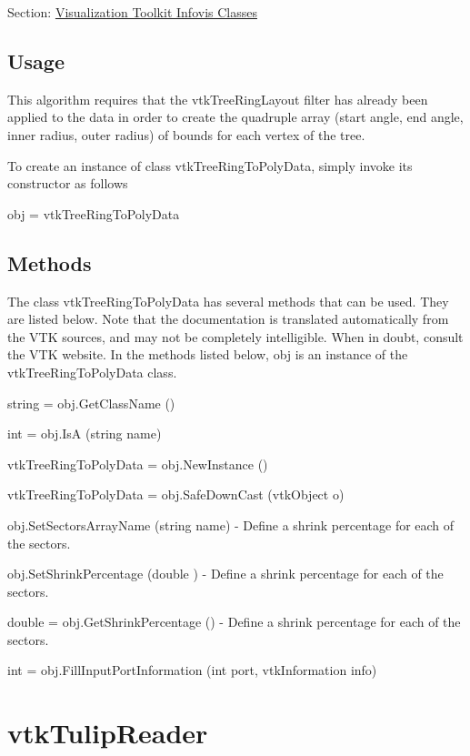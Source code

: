 Section\-: \hyperlink{sec_vtkinfovis}{Visualization Toolkit Infovis Classes} \hypertarget{vtkwidgets_vtkxyplotwidget_Usage}{}\subsection{Usage}\label{vtkwidgets_vtkxyplotwidget_Usage}
This algorithm requires that the vtk\-Tree\-Ring\-Layout filter has already been applied to the data in order to create the quadruple array (start angle, end angle, inner radius, outer radius) of bounds for each vertex of the tree.

To create an instance of class vtk\-Tree\-Ring\-To\-Poly\-Data, simply invoke its constructor as follows \begin{DoxyVerb}  obj = vtkTreeRingToPolyData
\end{DoxyVerb}
 \hypertarget{vtkwidgets_vtkxyplotwidget_Methods}{}\subsection{Methods}\label{vtkwidgets_vtkxyplotwidget_Methods}
The class vtk\-Tree\-Ring\-To\-Poly\-Data has several methods that can be used. They are listed below. Note that the documentation is translated automatically from the V\-T\-K sources, and may not be completely intelligible. When in doubt, consult the V\-T\-K website. In the methods listed below, {\ttfamily obj} is an instance of the vtk\-Tree\-Ring\-To\-Poly\-Data class. 
\begin{DoxyItemize}
\item {\ttfamily string = obj.\-Get\-Class\-Name ()}  
\item {\ttfamily int = obj.\-Is\-A (string name)}  
\item {\ttfamily vtk\-Tree\-Ring\-To\-Poly\-Data = obj.\-New\-Instance ()}  
\item {\ttfamily vtk\-Tree\-Ring\-To\-Poly\-Data = obj.\-Safe\-Down\-Cast (vtk\-Object o)}  
\item {\ttfamily obj.\-Set\-Sectors\-Array\-Name (string name)} -\/ Define a shrink percentage for each of the sectors.  
\item {\ttfamily obj.\-Set\-Shrink\-Percentage (double )} -\/ Define a shrink percentage for each of the sectors.  
\item {\ttfamily double = obj.\-Get\-Shrink\-Percentage ()} -\/ Define a shrink percentage for each of the sectors.  
\item {\ttfamily int = obj.\-Fill\-Input\-Port\-Information (int port, vtk\-Information info)}  
\end{DoxyItemize}\hypertarget{vtkinfovis_vtktulipreader}{}\section{vtk\-Tulip\-Reader}\label{vtkinfovis_vtktulipreader}
